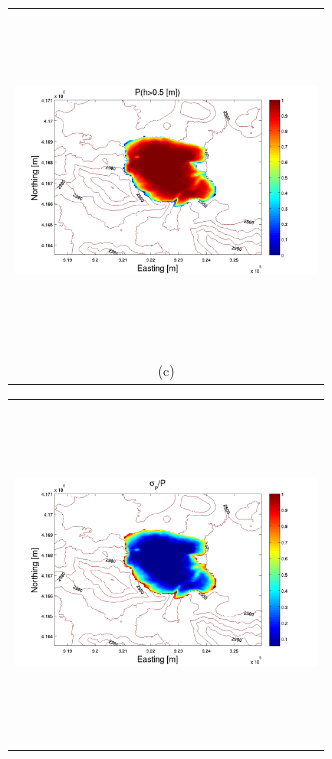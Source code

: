 \documentclass[12pt]{article}
\newcommand{\Pic}[2][0.85]{\begin{center}\texttt{[image: \#2]}
 \end{center} }
\begin{document}
\begin{figure}[H]
\begin{minipage}{0.6\textwidth}
\begin{tabular}{c}
        \end{tabular}
    \end{minipage} 
        \begin{minipage}[b]{0.6\textwidth}
        \begin{tabular}{c}
       \includegraphics[width=8cm,height=9cm,keepaspectratio]{figs_pdf/Mammoth_3_P.pdf}\\
        (c)
        \end{tabular}
    \end{minipage}
    \begin{minipage}{0.6\textwidth}
        \begin{tabular}{c}
	\includegraphics[width=8cm,height=9cm,keepaspectratio]{figs_pdf/Mammoth_3_sigma.pdf}\\

\end{tabular}
\end{minipage}
\end{figure}
\end{document}
